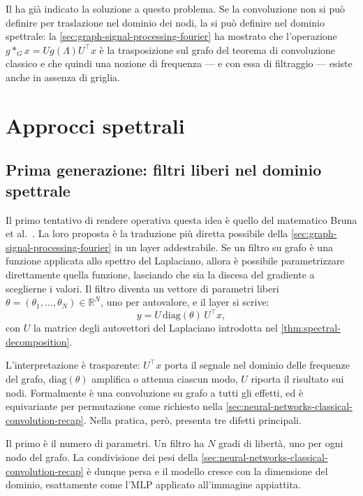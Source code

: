 Il  ha già indicato la soluzione a questo problema. Se la convoluzione non si può definire per traslazione nel dominio dei nodi, la si può definire nel dominio spettrale: la \cref{sec:graph-signal-processing-fourier} ha mostrato che l'operazione $g\ast_G x = Ug(\Lambda)U^\top x$ è la trasposizione sul grafo del teorema di convoluzione classico e che quindi una nozione di frequenza — e con essa di filtraggio — esiste anche in assenza di griglia.

\section{Approcci spettrali}
\label{sec:spectral-cnn-chebnet}

\subsection{Prima generazione: filtri liberi nel dominio spettrale}

Il primo tentativo di rendere operativa questa idea è quello del matematico Bruna et al.~\cite{bruna2014spectral}. La loro proposta è la traduzione più diretta possibile della \cref{sec:graph-signal-processing-fourier} in un layer addestrabile. Se un filtro su grafo è una funzione applicata allo spettro del Laplaciano, allora è possibile parametrizzare direttamente quella funzione, lasciando che sia la discesa del gradiente a sceglierne i valori. Il filtro diventa un vettore di parametri liberi $\theta=(\theta_1,\dots,\theta_N)\in\mathbb{R}^N$, uno per autovalore, e il layer si scrive:
\begin{equation}
\label{eq:spectral-cnn}
y = U\,\mathrm{diag}(\theta)\,U^\top x,
\end{equation}
con $U$ la matrice degli autovettori del Laplaciano introdotta nel \cref{thm:spectral-decomposition}.

L'interpretazione è trasparente: $U^\top x$ porta il segnale nel dominio delle frequenze del grafo, $\mathrm{diag}(\theta)$ amplifica o attenua ciascun modo, $U$ riporta il risultato sui nodi. Formalmente è una convoluzione su grafo a tutti gli effetti, ed è equivariante per permutazione come richiesto nella \cref{sec:neural-networks-classical-convolution-recap}. Nella pratica, però, presenta tre difetti principali.

Il primo è il numero di parametri. Un filtro ha $N$ gradi di libertà, uno per ogni nodo del grafo. La condivisione dei pesi della \cref{sec:neural-networks-classical-convolution-recap} è dunque persa e il modello cresce con la dimensione del dominio, esattamente come l'MLP applicato all'immagine appiattita.


